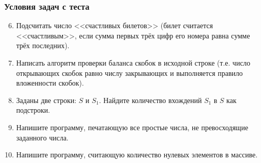 \documentclass[xetex,mathserif,serif]{beamer}
\begin{document}
	\begin{frame}
		\frametitle{Условия задач с теста}
		\begin{enumerate}
			\setcounter{enumi}{5}
			\item Подсчитать число <<счастливых билетов>> (билет считается <<счастливым>>, если сумма первых трёх цифр его номера равна сумме трёх последних).
			\item Написать алгоритм проверки баланса скобок в исходной строке (т.е. число открывающих скобок равно числу закрывающих и выполняется правило вложенности скобок).
			\item Заданы две строки: $S$ и $S_1$. Найдите количество вхождений $S_1$ в $S$ как подстроки.
			\item Напишите программу, печатающую все простые числа, не превосходящие заданного числа.
			\item Напишите программу, считающую количество нулевых элементов в массиве.
		\end{enumerate}
	\end{frame}
\end{document}

